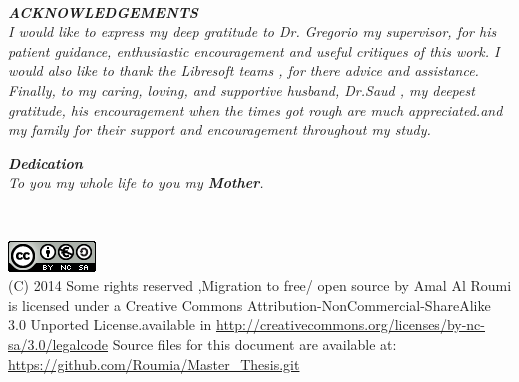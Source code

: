 \documentclass[a4paper, 12pt]{book}
\begin{document}
\newpage
~
\thispagestyle{empty}
\vspace{3cm}
\begin{flushright}
\textbf{\textit{ACKNOWLEDGEMENTS}} \\
\textit{I would like to express my deep gratitude to Dr. Gregorio my
  supervisor, for his patient guidance, enthusiastic encouragement and
  useful critiques of this work.
I would also like to thank the Libresoft teams , for there advice and assistance. \\
Finally, to my caring, loving, and supportive husband, Dr.Saud , my
deepest gratitude, his encouragement when the times got rough are much appreciated.and my family  for their support and encouragement throughout my study.
 }
 
 \vspace{2cm}
\textbf{\textit{Dedication}} \\
\textit{To you my whole life to you my   \textbf{Mother}.}
\end{flushright}
\newpage
\thispagestyle{empty}
~
\newpage
~
\thispagestyle{empty}
\vspace{16cm}
\begin{flushright}
\includegraphics[scale=1.2]{img/cc-by-ns.png} \\

(C) 2014 Some rights reserved ,Migration to free/ open source by Amal Al Roumi is licensed under a Creative Commons Attribution-NonCommercial-ShareAlike 3.0 Unported  License.available in
 \url {http://creativecommons.org/licenses/by-nc-sa/3.0/legalcode}
Source files for this document are available at: \url{https://github.com/Roumia/Master_Thesis.git}

\end{flushright}
\newpage
~
\thispagestyle{empty}
\tableofcontents  
\listoffigures  

\end{document}
